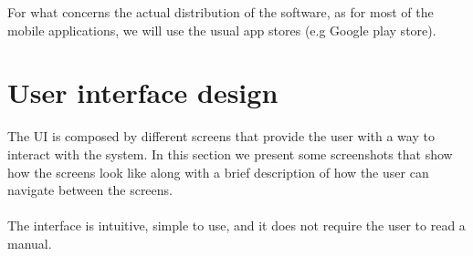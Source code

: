 \documentclass{article}
\begin{document}
For what concerns the actual distribution of the software, as for most of the
mobile applications, we will use the usual app stores (e.g Google play store).

\newpage

\section{User interface design}

The UI is composed by different screens that provide the user with a way to
interact with the system. In this section we present some screenshots that show
how the screens look like along with a brief description of how the user can
navigate between the screens.
\\\\
The interface is intuitive, simple to use, and it does not require the user to
read a manual.
\end{document}
